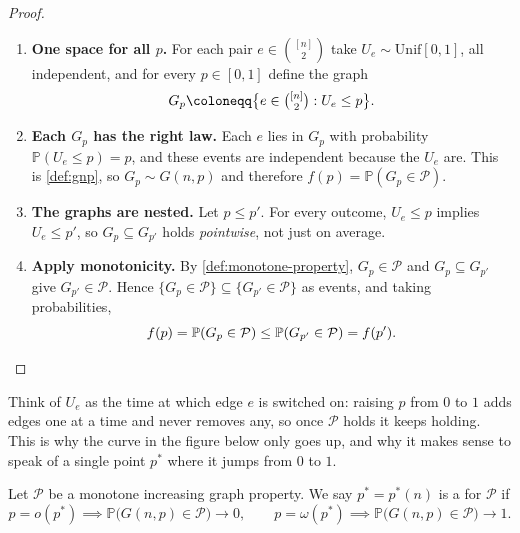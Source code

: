 \begin{proof}
    \begin{enumerate}[(1)]
        \item \textbf{One space for all \(p\).} For each pair \(e \in \binom{[n]}{2}\) take \(U_e \sim \mathrm{Unif}[0,1]\), all independent, and for every \(p \in [0,1]\) define the graph
        \[
            G_p \coloneqq \bigl\{ e \in \tbinom{[n]}{2} : U_e \le p \bigr\}.
        \]
        \item \textbf{Each \(G_p\) has the right law.} Each \(e\) lies in \(G_p\) with probability \(\mathbb{P}(U_e \le p) = p\), and these events are independent because the \(U_e\) are. This is \autoref{def:gnp}, so \(G_p \sim G(n,p)\) and therefore \(f(p) = \mathbb{P}(G_p \in \mathcal{P})\).
        \item \textbf{The graphs are nested.} Let \(p \le p'\). For every outcome, \(U_e \le p\) implies \(U_e \le p'\), so \(G_p \subseteq G_{p'}\) holds \emph{pointwise}, not just on average.
        \item \textbf{Apply monotonicity.} By \autoref{def:monotone-property}, \(G_p \in \mathcal{P}\) and \(G_p \subseteq G_{p'}\) give \(G_{p'} \in \mathcal{P}\). Hence \(\{G_p \in \mathcal{P}\} \subseteq \{G_{p'} \in \mathcal{P}\}\) as events, and taking probabilities,
        \[
            f(p) = \mathbb{P}(G_p \in \mathcal{P}) \le \mathbb{P}(G_{p'} \in \mathcal{P}) = f(p'). \qedhere
        \]
    \end{enumerate}
\end{proof}

Think of \(U_e\) as the time at which edge \(e\) is switched on: raising \(p\) from \(0\) to \(1\) adds edges one at a time and never removes any, so once \(\mathcal{P}\) holds it keeps holding. This is why the curve in the figure below only goes up, and why it makes sense to speak of a single point \(p^{*}\) where it jumps from \(0\) to \(1\).

\begin{definition}[Threshold]\label{def:threshold}
    Let \(\mathcal{P}\) be a monotone increasing graph property. We say \(p^{*} = p^{*}(n)\) is a  for \(\mathcal{P}\) if
    \[
        p = o(p^{*}) \implies \mathbb{P}\bigl( G(n,p) \in \mathcal{P} \bigr) \to 0,
        \qquad
        p = \omega(p^{*}) \implies \mathbb{P}\bigl( G(n,p) \in \mathcal{P} \bigr) \to 1 .
    \]
\end{definition}

